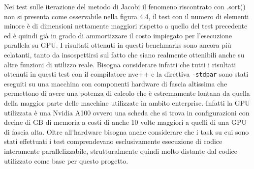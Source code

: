 \documentclass[12pt,a4paper]{report}
\begin{document}
\begin{figure}[H]
\centering
\begin{floatrow}[1]
\end{floatrow}
\end{figure} 

Nei test sulle iterazione del metodo di Jacobi il fenomeno riscontrato con .sort() non si presenta come osservabile nella figura 4.4, il test con il numero di elementi minore è di dimensioni nettamente maggiori rispetto a quello del test precedente ed è quindi già in grado di ammortizzare il costo impiegato per l'esecuzione parallela su GPU.
I risultati ottenuti in questi benchmarks sono ancora più eclatanti, tanto da insospettirsi sul fatto che siano realmente ottenibili anche su altre funzioni di utilizzo reale. \newline
Bisogna considerare infatti che tutti i risultati ottenuti in questi test con il compilatore nvc++ e la direttiva \verb|-stdpar| sono stati eseguiti su una macchina con componenti hardware di fascia altissima che permettono di avere una potenza di calcolo che è estremamente lontana da quella della maggior parte delle macchine utilizzate in ambito enterprise. Infatti la GPU utilizzata è una Nvidia A100 ovvero una scheda che si trova in configurazioni con decine di GB di memoria a costi di anche 10 volte maggiori a quelli di una GPU di fascia alta. \newline
Oltre all'hardware bisogna anche considerare che i task su cui sono stati effettuati i test comprendevano esclusivamente esecuzione di codice interamente parallelizzabile, strutturalmente quindi molto distante dal codice utilizzato come base per questo progetto.
\end{document}
